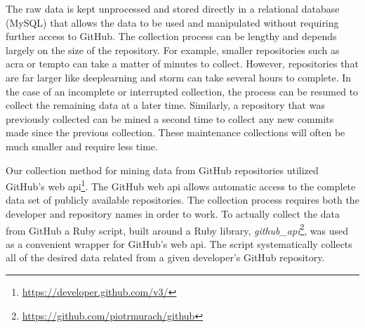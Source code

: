 The raw data is kept unprocessed and stored directly in a relational database (MySQL) that allows the data to be used and manipulated without requiring further access to GitHub. The collection process can be lengthy and depends largely on the size of the repository. For example, smaller repositories such as acra or tempto can take a matter of minutes to collect. However, repositories that are far larger like deeplearning and storm can take several hours to complete. In the case of an incomplete or interrupted collection, the process can be resumed to collect the remaining data at a later time. Similarly, a repository that was previously collected can be mined a second time to collect any new commits made since the previous collection. These maintenance collections will often be much smaller and require less time.


Our collection method for mining data from GitHub repositories utilized GitHub's web \gls{api}\footnote{\url{https://developer.github.com/v3/}}. The GitHub web \gls{api} allows automatic access to the complete data set of publicly available repositories. The collection process requires both the developer and repository names in order to work. To actually collect the data from GitHub a Ruby script, built around a Ruby library, \textit{github\_api}\footnote{\url{https://github.com/piotrmurach/github}}, was used as a convenient wrapper for GitHub's web \gls{api}. The script systematically collects all of the desired data related from a given developer's GitHub repository.

